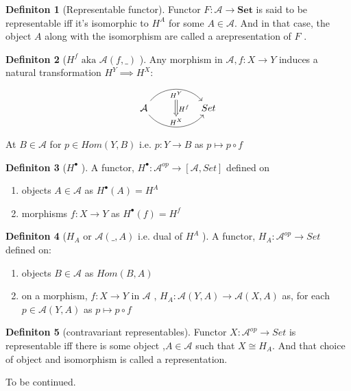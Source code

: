 \documentclass{article}
\theoremstyle{definition}
\theoremstyle{definition}
\newtheorem{definition}{Definiton}[section]
\theoremstyle{definition}
\theoremstyle{definition}
\begin{document}
\begin{definition}[Representable functor] %
	Functor $F:\mathcal{A} \rightarrow \textbf{Set}$ is said to be representable iff it's isomorphic to
	$H^A$ for some $A \in \mathcal{A} $. And in that case, the object $A$ along with the isomorphism
	are called a arepresentation of $F$ .
\end{definition}

\begin{definition}[$H^f \text{ aka } \mathcal{A} (f, \_)$ ] %
	Any morphism in $\mathcal{A}, f:X \rightarrow Y	$ induces a natural transformation $H^Y \implies H^X $:
	\[ 	\begin{tikzcd}[row sep=large, column sep=huge]
	\mathcal{ \mathcal{A} } \arrow[r,bend left=50, "H^Y"{name=U, below}]
	\arrow[r, bend right = 50, "H^X"{name=D, above}]
	& Set \arrow[Rightarrow, from=U , to=D, "H^f"]
		\end{tikzcd} \]
		At $B \in \mathcal{A} $ for $p \in Hom (Y,B) \text{ i.e. } p:Y \rightarrow B $ as
		$p \mapsto p \circ f$
\end{definition}

\begin{definition}[$H^\bullet$ ] %
	A functor, $H^\bullet : \mathcal{A} ^{op} \rightarrow [ \mathcal{A} , Set ] $ defined on
	\begin{enumerate}[label=\roman*]
		\item objects $A \in \mathcal{A} $ as $H^\bullet (A) = H^A$
		\item morphisms $f:X\rightarrow Y$ as $H^\bullet(f)=H^f$
	\end{enumerate}
\end{definition}

\begin{definition}[$H_A$ or $\mathcal{A} (\_,A)$  i.e. dual of $H^A$ ] %
	A functor, $H_A: \mathcal{A} ^{op} \rightarrow Set$ defined on:
	\begin{enumerate}[label=\roman*]
		\item objects $B \in \mathcal{A} $ as $Hom(B,A)$
		\item on a morphism, $f : X \rightarrow Y $ in $\mathcal{A}$ , $H_A: \mathcal{A} (Y,A) \rightarrow \mathcal{A}(X,A) $ as, for each $p \in \mathcal{A}(Y,A) $ as $p \mapsto p \circ f$
	\end{enumerate}
\end{definition}

\begin{definition}[contravariant representables] %
	Functor $X: \mathcal{A} ^{op} \rightarrow Set $ is representable iff there is some object ,$A \in \mathcal{A} $ such that $ X \cong H_A $. And that choice of object and isomorphism is called a representation.
\end{definition}





\pagebreak
To be continued.
\end{document}
